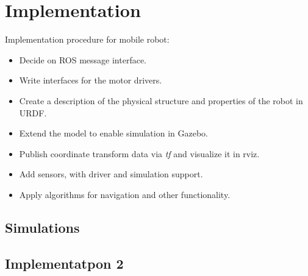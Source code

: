 \chapter{Implementation}
\label{chp:implementation} 

Implementation procedure for mobile robot:

\begin{itemize}

	\item Decide on ROS message interface.
	\item Write interfaces for the motor drivers.
	\item Create a description of the physical structure and properties of the robot in \ac{URDF}. 
	\item Extend the model to enable simulation in Gazebo.
	\item Publish coordinate transform data via \textit{tf} and visualize it in rviz.
	\item Add sensors, with driver and simulation support.
	\item Apply algorithms for navigation and other functionality. 

\end{itemize}

\section{Simulations}


\section{Implementatpon 2}
